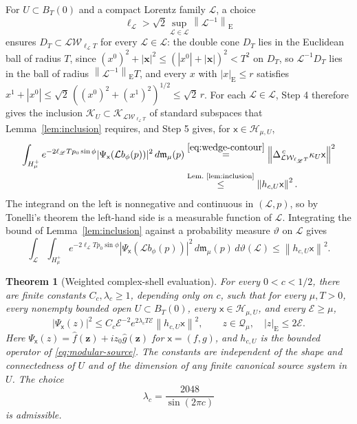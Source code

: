 \documentclass[11pt]{amsart}
\numberwithin{equation}{section}
\newtheorem{theorem}{Theorem}[section]
\theoremstyle{definition}
\newcommand{\Hh}{\mathcal H}
\newcommand{\sx}{\mathsf x}
\newcommand{\bx}{\mathbf x}
\newcommand{\bz}{\mathbf z}
\newcommand{\Energy}{\mathcal E}
\newcommand{\norm}[1]{\left\|#1\right\|}
\newcommand{\wh}[1]{\widehat{#1}}
\begin{document}
For \(U\subset B_T(0)\) and a compact Lorentz family \(\mathscr L\), a
choice
\[
 \ell_{\mathscr L}>
 \sqrt2\sup_{\mathcal L\in\mathscr L}
       \norm{\mathcal L^{-1}}_{\mathrm E}
\]
ensures \(D_T\subset\mathcal L\mathcal W_{\ell_{\mathscr L}T}\) for every
\(\mathcal L\in\mathscr L\): the double cone \(D_T\) lies in the Euclidean
ball of radius \(T\), since \((x^0)^2+|\bx|^2\le(|x^0|+|\bx|)^2<T^2\) on
\(D_T\), so \(\mathcal L^{-1}D_T\) lies in the ball of radius
\(\norm{\mathcal L^{-1}}_{\mathrm E}T\), and every \(x\) with
\(|x|_{\mathrm E}\le r\) satisfies
\(x^1+|x^0|\le\sqrt2\,((x^0)^2+(x^1)^2)^{1/2}\le\sqrt2\,r\).
For each \(\mathcal L\in\mathscr L\), Step 4 therefore gives the inclusion
\(\mathcal K_U\subset\mathcal K_{\mathcal L\mathcal W_{\ell_{\mathscr L}T}}\)
of standard subspaces that Lemma~\ref{lem:inclusion} requires, and Step 5
gives, for \(\sx\in\Hh_{\mu,U}\),
\begin{align*}
 \int_{H_\mu^+}e^{-2\ell_{\mathscr L}Tp_0\sin\phi}
 |\Psi_\sx(\mathcal Lb_\phi(p))|^2\,d\mathfrak m_\mu(p)
 &\overset{\eqref{eq:wedge-contour}}{=}
 \norm{\Delta_{\mathcal L\mathcal W_{\ell_{\mathscr L}T}}^{\,c}\kappa_U\sx}^2\\
 &\overset{\text{Lem.~\ref{lem:inclusion}}}{\le}
 \norm{h_{c,U}\sx}^2.
\end{align*}
The integrand on the left is nonnegative and continuous in
\((\mathcal L,p)\), so by Tonelli's theorem the left-hand side is a
measurable function of \(\mathcal L\).
Integrating the bound of Lemma~\ref{lem:inclusion} against a probability measure
\(\vartheta\) on \(\mathscr L\) gives
\begin{equation}
 \int_{\mathscr L}\int_{H_\mu^+}
 e^{-2\ell_{\mathscr L}Tp_0\sin\phi}
 |\Psi_\sx(\mathcal Lb_\phi(p))|^2
 \,d\mathfrak m_\mu(p)\,d\vartheta(\mathcal L)
 \le\norm{h_{c,U}\sx}^2.
 \label{eq:averaged-wedges}
\end{equation}

\begin{theorem}[Weighted complex-shell evaluation]\label{thm:evaluation}
For every \(0<c<1/2\), there are finite constants \(C_c,\lambda_c\ge1\),
depending only on \(c\), such that for every \(\mu,T>0\), every nonempty
bounded open \(U\subset B_T(0)\), every \(\sx\in\Hh_{\mu,U}\), and every \(\Energy\ge\mu\),
\begin{equation}
 |\Psi_\sx(z)|^2
 \le C_c\Energy^{-2}e^{2\lambda_cT\Energy}
       \norm{h_{c,U}\sx}^2,
 \qquad
 z\in\mathcal Q_\mu,\quad |z|_{\mathrm E}\le2\Energy.
 \label{eq:evaluation}
\end{equation}
Here \(\Psi_\sx(z)=\wh f(\bz)+iz_0\wh g(\bz)\) for \(\sx=(f,g)\), and
\(h_{c,U}\) is the bounded operator of \eqref{eq:modular-source}. The
constants are independent of the shape and connectedness of \(U\) and
of the dimension of any finite canonical source system in \(U\). The choice
\[
 \lambda_c=\frac{2048}{\sin(2\pi c)}
\]
is admissible.
\end{theorem}
\end{document}
